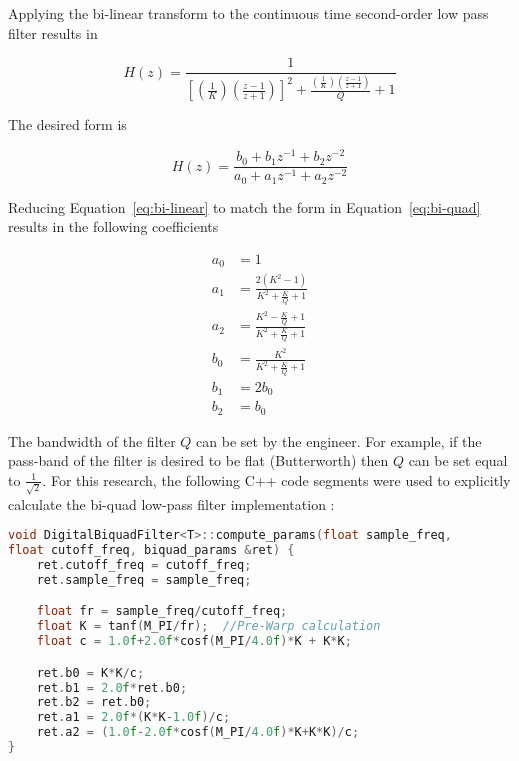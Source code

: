 Applying the bi-linear transform to the continuous time second-order low pass filter results in

\begin{equation}\label{eq:bi-linear}
 H(z) = \frac{1}{ \left[\left(\frac{1}{K}\right)\left(\frac{z-1}{z+1}\right)\right]^2+\frac{ \left(\frac{1}{K}\right)\left(\frac{z-1}{z+1}\right)}{Q}+1}
\end{equation}

The desired form is

\begin{equation}\label{eq:bi-quad}
 H(z) = \frac{b_0 + b_1 z^{-1} + b_2 z^{-2}}{a_0 + a_1 z^{-1} + a_2 z^{-2}}
\end{equation}

Reducing Equation~\ref{eq:bi-linear} to match the form in Equation~\ref{eq:bi-quad} results in the following coefficients

\begin{equation}
\begin{split}
 a_0 &= 1 \\
 a_1 &= \frac{2(K^2-1)}{K^2+\frac{K}{Q}+1} \\
 a_2 &= \frac{K^2-\frac{K}{Q}+1}{K^2+\frac{K}{Q}+1} \\
 b_0 &= \frac{K^2}{K^2+\frac{K}{Q}+1} \\
 b_1 &= 2b_0 \\
 b_2 &= b_0  
\end{split}
\end{equation}

The bandwidth of the filter $Q$ can be set by the engineer.  For example, if the pass-band of the filter is desired to be flat (Butterworth) then $Q$ can be set equal to $\frac{1}{\sqrt{2}}$.  For this research, the following C++ code segments were used to explicitly calculate the bi-quad low-pass filter implementation \cite{apm_source_code}: \newline

\begin{lstlisting}[language=c++]
void DigitalBiquadFilter<T>::compute_params(float sample_freq, 
float cutoff_freq, biquad_params &ret) {
    ret.cutoff_freq = cutoff_freq;
    ret.sample_freq = sample_freq;

    float fr = sample_freq/cutoff_freq;
    float K = tanf(M_PI/fr);  //Pre-Warp calculation
    float c = 1.0f+2.0f*cosf(M_PI/4.0f)*K + K*K;

    ret.b0 = K*K/c;
    ret.b1 = 2.0f*ret.b0;
    ret.b2 = ret.b0;
    ret.a1 = 2.0f*(K*K-1.0f)/c;
    ret.a2 = (1.0f-2.0f*cosf(M_PI/4.0f)*K+K*K)/c;
}
\end{lstlisting}

